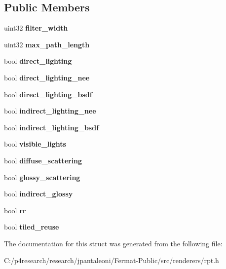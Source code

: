 \subsection*{Public Members}
\begin{DoxyCompactItemize}
\item 
\mbox{\label{struct_r_p_t_options_a316c6c75a1e1a974b386f87519756db7}} 
uint32 {\bfseries filter\+\_\+width}
\item 
\mbox{\label{struct_r_p_t_options_a96eeebb1aabba1817723a1c167361556}} 
uint32 {\bfseries max\+\_\+path\+\_\+length}
\item 
\mbox{\label{struct_r_p_t_options_a9ccd93d0b4c2c1b5d1e24afc3f9e798c}} 
bool {\bfseries direct\+\_\+lighting}
\item 
\mbox{\label{struct_r_p_t_options_a07432de676616186d97c3f1e522a2deb}} 
bool {\bfseries direct\+\_\+lighting\+\_\+nee}
\item 
\mbox{\label{struct_r_p_t_options_a4d5c4f23d7b697a11b52b9f6854919e8}} 
bool {\bfseries direct\+\_\+lighting\+\_\+bsdf}
\item 
\mbox{\label{struct_r_p_t_options_a96183378c1b4e6ff5580e76e7297547f}} 
bool {\bfseries indirect\+\_\+lighting\+\_\+nee}
\item 
\mbox{\label{struct_r_p_t_options_a57880a252f19cb77687d69dbb86ae631}} 
bool {\bfseries indirect\+\_\+lighting\+\_\+bsdf}
\item 
\mbox{\label{struct_r_p_t_options_a19c8d6df7c376f127d28cf576cff1765}} 
bool {\bfseries visible\+\_\+lights}
\item 
\mbox{\label{struct_r_p_t_options_a3c00de23410a66eaa3fe8ef1666f62b9}} 
bool {\bfseries diffuse\+\_\+scattering}
\item 
\mbox{\label{struct_r_p_t_options_a34592bdab56a14d5b1d966b167bb7d8c}} 
bool {\bfseries glossy\+\_\+scattering}
\item 
\mbox{\label{struct_r_p_t_options_a3e105cf297fa5781c4ab91c0ee32696c}} 
bool {\bfseries indirect\+\_\+glossy}
\item 
\mbox{\label{struct_r_p_t_options_a0bbff1e3eb0ac3788a5aa42834d50bfa}} 
bool {\bfseries rr}
\item 
\mbox{\label{struct_r_p_t_options_a73b9c9ef467856cfb53627cbcd153c44}} 
bool {\bfseries tiled\+\_\+reuse}
\end{DoxyCompactItemize}


The documentation for this struct was generated from the following file\+:\begin{DoxyCompactItemize}
\item 
C\+:/p4research/research/jpantaleoni/\+Fermat-\/\+Public/src/renderers/rpt.\+h\end{DoxyCompactItemize}
